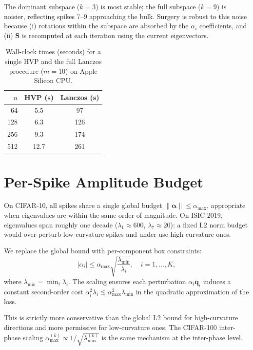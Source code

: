 \documentclass[11pt,a4paper]{article}
\newcommand{\mat}[1]{\bm{#1}}
\newcommand{\vect}[1]{\bm{#1}}
\begin{document}
The dominant subspace ($k{=}3$) is most stable; the full subspace
($k{=}9$) is noisier, reflecting spikes 7--9 approaching the bulk.
Surgery is robust to this noise because (i) rotations within the
subspace are absorbed by the $\alpha_i$ coefficients, and (ii)
$\mat{S}$ is recomputed at each iteration using the current eigenvectors.

\begin{table}[ht]
\centering
\caption{Wall-clock times (seconds) for a single HVP and the full
Lanczos procedure ($m=10$) on Apple Silicon CPU.}
\label{tab:timing}
\begin{tabular}{rcc}
\toprule
$n$ & HVP (s) & Lanczos (s) \\
\midrule
 64 &   5.5 &   97 \\
128 &   6.3 &  126 \\
256 &   9.3 &  174 \\
512 &  12.7 &  261 \\
\bottomrule
\end{tabular}
\end{table}


\section{Per-Spike Amplitude Budget}
\label{app:per-spike}

On CIFAR-10, all spikes share a single global budget
$\|\vect{\alpha}\| \leq \alpha_{\max}$, appropriate when eigenvalues
are within the same order of magnitude. On ISIC-2019, eigenvalues span
roughly one decade ($\lambda_1 \approx 600$, $\lambda_7 \approx 20$):
a fixed L2 norm budget would over-perturb low-curvature spikes and
under-use high-curvature ones.

We replace the global bound with per-component box constraints:
\begin{equation}
  |\alpha_i| \leq \alpha_{\max} \sqrt{\frac{\lambda_{\min}}{\lambda_i}},
  \quad i = 1, \ldots, K,
\end{equation}
where $\lambda_{\min} = \min_i \lambda_i$. The scaling ensures each
perturbation $\alpha_i\vect{q}_i$ induces a constant second-order cost
$\alpha_i^2\lambda_i \lesssim \alpha_{\max}^2\lambda_{\min}$ in the
quadratic approximation of the loss.

This is strictly more conservative than the global L2 bound for
high-curvature directions and more permissive for low-curvature ones.
The CIFAR-100 inter-phase scaling
$\alpha_{\max}^{(k)} \propto 1/\sqrt{\lambda_{\max}^{(k)}}$ is the
same mechanism at the inter-phase level.
\end{document}
